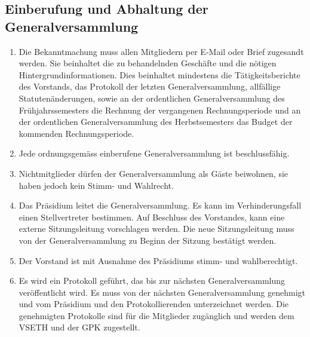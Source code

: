 \subsection{Einberufung und Abhaltung der Generalversammlung}
\begin{enumerate}
\item Die Bekanntmachung muss allen Mitgliedern per E-Mail oder Brief zugesandt werden. Sie beinhaltet die zu behandelnden Geschäfte und die nötigen Hintergrundinformationen. Dies beinhaltet mindestens die Tätigkeitsberichte des Vorstands, das Protokoll der letzten Generalversammlung, allfällige Statutenänderungen, sowie an der ordentlichen Generalversammlung des Frühjahrssemesters die Rechnung der vergangenen Rechnungsperiode und an der ordentlichen Generalversammlung des Herbstsemesters das Budget der kommenden Rechnungsperiode.
\item Jede ordnungsgemäss einberufene Generalversammlung ist beschlussfähig.
\item Nichtmitglieder dürfen der Generalversammlung als Gäste beiwohnen, sie haben jedoch kein Stimm- und Wahlrecht.
\item Das Präsidium leitet die Generalversammlung. Es kann im Verhinderungsfall einen Stellvertreter bestimmen. Auf Beschluss des Vorstandes, kann eine externe Sitzungsleitung vorschlagen werden. Die neue
Sitzungsleitung muss von der Generalversammlung zu Beginn der Sitzung bestätigt werden.
\item Der Vorstand ist mit Ausnahme des Präsidiums stimm- und wahlberechtigt.
\item Es wird ein Protokoll geführt, das bis zur nächsten Generalversammlung veröffentlicht wird. Es muss von der nächsten Generalversammlung genehmigt und vom Präsidium und den Protokollierenden unterzeichnet werden. Die genehmigten Protokolle sind für die Mitglieder zugänglich und werden dem VSETH und der GPK zugestellt.
\end{enumerate}


